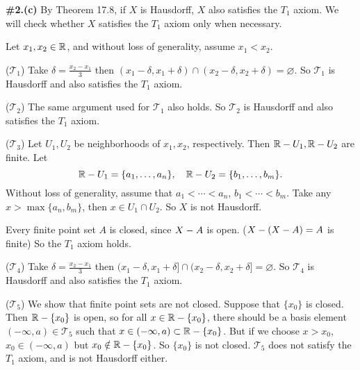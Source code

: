 \documentclass[a4paper,11pt]{article}
\newcommand{\T}{\mathcal{T}}
\begin{document}
\newpage

\phantom{?}
\vspace{5mm}

\begin{minipage}[t][270mm]{90mm}
    {\bfseries \large \#2.(c)} By Theorem 17.8, if \(X\) is Hausdorff, \(X\) also satisfies the \(T_1\) axiom. We will check whether \(X\) satisfies the \(T_1\) axiom only when necessary.

    Let \(x_1, x_2 \in \mathbb{R}\), and without loss of generality, assume \(x_1 < x_2\).

    \bigskip

    (\(\T_1\)) Take \(\delta = \frac{x_2 - x_1}{3}\) then \((x_1 - \delta, x_1 + \delta) \cap (x_2 - \delta, x_2 + \delta) = \varnothing\). So \(\T_1\) is Hausdorff and also satisfies the \(T_1\) axiom.

    \bigskip

    (\(\T_2\)) The same argument used for \(\T_1\) also holds. So \(\T_2\) is Hausdorff and also satisfies the \(T_1\) axiom.

    \bigskip

    (\(\T_3\)) Let \(U_1, U_2\) be neighborhoods of \(x_1, x_2\), respectively. Then \(\mathbb{R} - U_1, \mathbb{R} - U_2\) are finite. Let
    \[
        \mathbb{R} - U_1 = \{a_1, \dots, a_n\}, \quad \mathbb{R} - U_2 = \{b_1, \dots, b_m\}.
    \]
    Without loss of generality, assume that \(a_1 < \cdots < a_n\), \(b_1 < \cdots < b_m\). Take any \(x > \max\{a_n, b_m\}\), then \(x \in U_1 \cap U_2\). So \(X\) is not Hausdorff.

    Every finite point set \(A\) is closed, since \(X - A\) is open. (\(X - \left( X - A \right) = A\) is finite) So the \(T_1\) axiom holds.

    \bigskip

    (\(\T_4\)) Take \(\delta = \frac{x_2 - x_1}{3}\) then \((x_1 - \delta, x_1 + \delta] \cap (x_2 - \delta, x_2 + \delta] = \varnothing\). So \(\T_4\) is Hausdorff and also satisfies the \(T_1\) axiom.

    \bigskip

    (\(\T_5\)) We show that finite point sets are not closed. Suppose that \(\{x_0\}\) is closed. Then \(\mathbb{R} - \{x_0\}\) is open, so for all \(x \in \mathbb{R} - \{x_0\}\), there should be a basis element \((-\infty, a) \in \T_5\) such that \(x \in (-\infty, a) \subset \mathbb{R} - \{x_0\}\). But if we choose \(x > x_0\), \(x_0 \in (-\infty, a)\) but \(x_0 \notin \mathbb{R}- \{x_0\}\). So \(\{x_0\}\) is not closed. \(\T_5\) does not satisfy the \(T_1\) axiom, and is not Hausdorff either.
\end{minipage}
{\color{gray}\vline}
\begin{minipage}[t][270mm]{90mm}
    \phantom{?}
\end{minipage}
\end{document}
